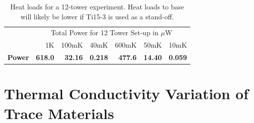 \documentclass{article}
\begin{document}
\begin{table}[h]
\begin{threeparttable}
\begin{tabular}{rrrr|rrr}
\toprule
 & \multicolumn{6}{c}{\large{Total Power for 12 Tower Set-up in $\mu$W}} \\
  & 1K & 100mK & 40mK & 600mK & 50mK & 10mK \\
 \cmidrule(r){2-7}
   \bf{\large{Power}} & \large{\bf{618.0}} & \large{\bf{32.16}} & \large{\bf{0.218}} & \large{\bf{477.6}} & \large{\bf{14.40}} & \large{\bf{0.059}} \\
\bottomrule
\end{tabular}
\end{threeparttable}
\caption{Heat loads for a 12-tower experiment. Heat loads to base will likely be lower if Ti15-3 is used as a stand-off.}
\end{table}


\newpage

\appendix
\section{Thermal Conductivity Variation of Trace Materials}
\end{document}
